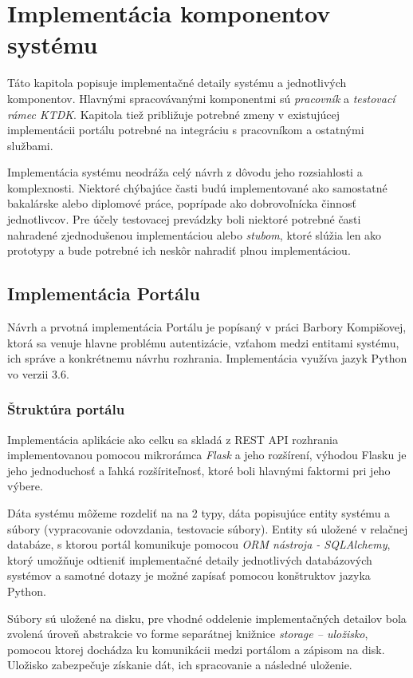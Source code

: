 \documentclass[
  digital, %
  twoside, %
  table,   %
  lof,     %
  lot,     %
]{fithesis3}
\begin{document}
\chapter{Implementácia komponentov systému}

Táto kapitola popisuje implementačné detaily systému a jednotlivých komponentov. Hlavnými spracovávanými komponentmi sú \emph{pracovník} a \emph{testovací rámec KTDK}. Kapitola tiež približuje potrebné zmeny v existujúcej implementácii portálu potrebné na integráciu s pracovníkom a ostatnými službami.

Implementácia systému neodráža celý návrh z dôvodu jeho rozsiahlosti a komplexnosti. Niektoré chýbajúce časti budú implementované ako samostatné bakalárske alebo diplomové práce, poprípade ako dobrovoľnícka činnosť jednotlivcov. Pre účely testovacej prevádzky boli niektoré potrebné časti nahradené zjednodušenou implementáciou alebo \emph{stubom}, ktoré slúžia len ako prototypy a bude potrebné ich neskôr nahradiť plnou implementáciou.


\section{Implementácia Portálu}

Návrh a prvotná implementácia Portálu je popísaný v práci Barbory Kompišovej, ktorá sa venuje hlavne problému autentizácie, vzťahom medzi entitami systému, ich správe a konkrétnemu návrhu rozhrania. Implementácia využíva jazyk Python vo verzii 3.6. 

\subsection{Štruktúra portálu}

Implementácia aplikácie ako celku sa skladá z REST API rozhrania implementovanou pomocou mikrorámca \emph{Flask} a jeho rozšírení, výhodou Flasku je jeho jednoduchosť a ľahká rozšíriteľnosť, ktoré boli hlavnými faktormi pri jeho výbere.

Dáta systému môžeme rozdeliť na na 2 typy, dáta popisujúce entity systému a súbory (vypracovanie odovzdania, testovacie súbory). 
Entity sú uložené v relačnej databáze, s ktorou portál komunikuje pomocou \emph{ORM nástroja - SQLAlchemy}, ktorý umožňuje odtieniť implementačné detaily jednotlivých databázových systémov a samotné dotazy je možné zapísať pomocou konštruktov jazyka Python.

Súbory sú uložené na disku, pre vhodné oddelenie implementačných detailov bola zvolená úroveň abstrakcie vo forme separátnej knižnice \emph{storage -- uložisko}, pomocou ktorej dochádza ku komunikácii medzi portálom a zápisom na disk. Uložisko zabezpečuje získanie dát, ich spracovanie a následné uloženie.
\end{document}
